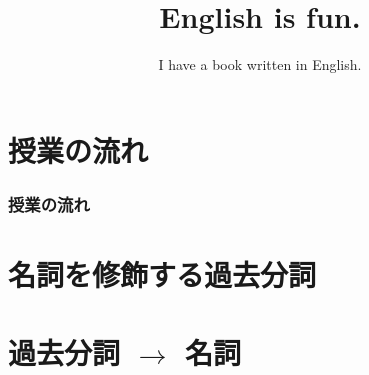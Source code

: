 \documentclass[aspectratio=169,xcolor={dvipsnames,table}]{beamer}
\title{English is fun.}
\subtitle{I have a book written in English.}
\author{}
\institute[]{}
\date[]
\begin{document}
\begin{frame}[plain]
  \titlepage
\end{frame}

\section*{授業の流れ}
\begin{frame}[plain]
  \frametitle{授業の流れ}
  \tableofcontents
\end{frame}
\section*{名詞を修飾する過去分詞}
\section{過去分詞 $\longrightarrow$ 名詞}
\end{document}
